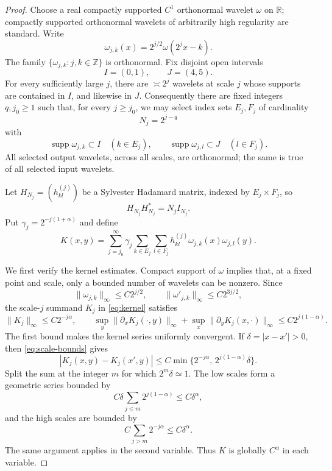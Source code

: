 \documentclass[11pt]{article}
\theoremstyle{remark}
\newcommand{\R}{\mathbb R}
\begin{document}
\begin{proof}
Choose a real compactly supported $C^1$ orthonormal wavelet $\omega$ on
$\R$; compactly supported orthonormal wavelets of arbitrarily high regularity
are standard.  Write
\[
                  \omega_{j,k}(x)=2^{j/2}\omega(2^jx-k).
\]
The family $\{\omega_{j,k}:j,k\in\mathbb Z\}$ is orthonormal.  Fix disjoint
open intervals
\[
                         I=(0,1),\qquad J=(4,5).
\]
For every sufficiently large $j$, there are $\asymp2^j$ wavelets at scale
$j$ whose supports are contained in $I$, and likewise in $J$.  Consequently
there are fixed integers $q,j_0\geq1$ such that, for every $j\geq j_0$, we
may select index sets $E_j,F_j$ of cardinality
\[
                            N_j=2^{j-q}
\]
with
\[
 \operatorname{supp}\omega_{j,k}\subset I\quad(k\in E_j),
 \qquad
 \operatorname{supp}\omega_{j,l}\subset J\quad(l\in F_j).
\]
All selected output wavelets, across all scales, are orthonormal; the same
is true of all selected input wavelets.

Let $H_{N_j}=(h^{(j)}_{kl})$ be a Sylvester Hadamard matrix, indexed by
$E_j\times F_j$, so
\begin{equation}\label{eq:hadamard}
                         H_{N_j}H_{N_j}^*=N_jI_{N_j}.
\end{equation}
Put $\gamma_j=2^{-j(1+\alpha)}$ and define
\begin{equation}\label{eq:kernel}
 K(x,y)=\sum_{j=j_0}^\infty \gamma_j
       \sum_{k\in E_j}\sum_{l\in F_j}
       h^{(j)}_{kl}\omega_{j,k}(x)\omega_{j,l}(y).
\end{equation}

We first verify the kernel estimates.  Compact support of $\omega$ implies
that, at a fixed point and scale, only a bounded number of wavelets can be
nonzero.  Since
\[
 \|\omega_{j,k}\|_\infty\leq C2^{j/2},\qquad
 \|\omega'_{j,k}\|_\infty\leq C2^{3j/2},
\]
the scale-$j$ summand $K_j$ in \eqref{eq:kernel} satisfies
\begin{equation}\label{eq:scale-bounds}
 \|K_j\|_\infty\leq C2^{-j\alpha},\qquad
 \sup_y\|\partial_xK_j(\cdot,y)\|_\infty
 +\sup_x\|\partial_yK_j(x,\cdot)\|_\infty
 \leq C2^{j(1-\alpha)}.
\end{equation}
The first bound makes the kernel series uniformly convergent.  If
$\delta=|x-x'|>0$, then \eqref{eq:scale-bounds} gives
\[
 |K_j(x,y)-K_j(x',y)|
 \leq C\min\{2^{-j\alpha},\,2^{j(1-\alpha)}\delta\}.
\]
Split the sum at the integer $m$ for which $2^m\delta\simeq1$.  The low
scales form a geometric series bounded by
\[
       C\delta\sum_{j\leq m}2^{j(1-\alpha)}\leq C\delta^\alpha,
\]
and the high scales are bounded by
\[
       C\sum_{j>m}2^{-j\alpha}\leq C\delta^\alpha.
\]
The same argument applies in the second variable.  Thus $K$ is globally
$C^\alpha$ in each variable.


\end{proof}
\end{document}
